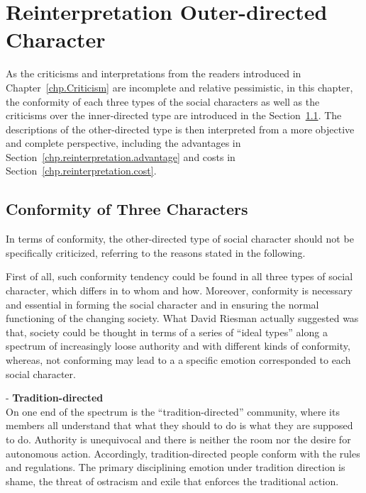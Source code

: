 \chapter{Reinterpretation Outer-directed Character}\label{chp.reinterpretation}
As the criticisms and interpretations from the readers introduced in Chapter~\ref{chp.Criticism} are incomplete and relative pessimistic, in this chapter, the conformity of each three types of the social characters as well as the criticisms over the inner-directed type are introduced in the Section~\ref{chp.reinterpretation.conformity}. The descriptions of the other-directed type is then interpreted from a more objective and complete perspective, including the advantages in Section~\ref{chp.reinterpretation.advantage} and costs in Section~\ref{chp.reinterpretation.cost}.

\section{Conformity of Three Characters}\label{chp.reinterpretation.conformity}

In terms of conformity, the other-directed type of social character should not be specifically criticized, referring to the reasons stated in the following. 


First of all, such conformity tendency could be found in all three types of social character, which differs in to whom and how. Moreover, conformity is necessary and essential in forming the social character and in ensuring the normal functioning of the changing society. What David Riesman actually suggested was that, society could be thought in terms of a series of ``ideal types'' along a spectrum of increasingly loose authority and with different kinds of conformity, whereas, not conforming may lead to a a specific emotion corresponded to each social character.

\noindent - \textbf{Tradition-directed}\\
On one end of the spectrum is the ``tradition-directed'' community, where its members all understand that what they should to do is what they are supposed to do. Authority is unequivocal and there is neither the room nor the desire for autonomous action. Accordingly, tradition-directed people conform with the rules and regulations. The primary disciplining emotion under tradition direction is shame, the threat of ostracism and exile that enforces the traditional action.\\


